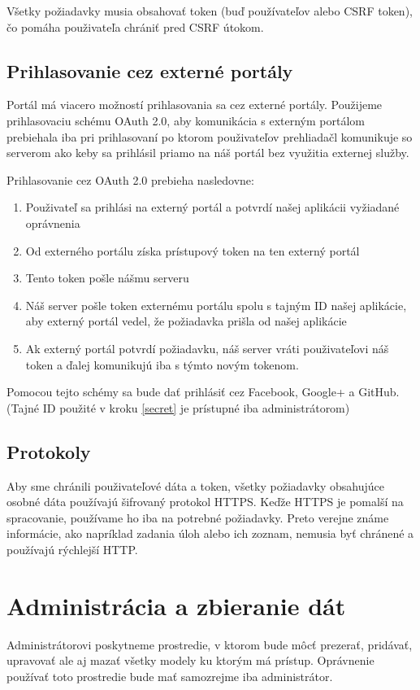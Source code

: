 Všetky požiadavky musia obsahovať token (buď používateľov alebo CSRF token),
čo pomáha použivateľa chrániť pred CSRF útokom.

\subsection{Prihlasovanie cez externé portály}
\label{oAuth}
Portál má viacero možností prihlasovania sa cez externé portály. Použijeme prihlasovaciu schému OAuth 2.0, aby komunikácia s externým
portálom prebiehala iba pri prihlasovaní po ktorom použivateľov prehliadačl komunikuje so serverom ako keby sa prihlásil priamo na náš portál bez využitia externej služby.

Prihlasovanie cez OAuth 2.0 prebieha nasledovne:
\begin{enumerate}
\item{Použivateľ sa prihlási na externý portál a potvrdí našej aplikácii vyžiadané oprávnenia}
\item{Od externého portálu získa prístupový token na ten externý portál}
\item \label{secret}{Tento token pošle nášmu serveru}
\item{Náš server pošle token externému portálu spolu s tajným ID našej aplikácie, aby externý portál vedel, že požiadavka prišla od našej aplikácie}
\item{Ak externý portál potvrdí požiadavku, náš server vráti použivateľovi náš token a ďalej komunikujú iba s týmto novým tokenom.}
\end{enumerate}

Pomocou tejto schémy sa bude dať prihlásiť cez Facebook, Google+ a GitHub.
\newline
(Tajné ID použité v kroku \ref{secret} je prístupné iba administrátorom)

\subsection{Protokoly}
Aby sme chránili použivateľové dáta a token, všetky požiadavky obsahujúce osobné dáta používajú šifrovaný protokol HTTPS. Keďže HTTPS je pomalší na spracovanie,
používame ho iba na potrebné požiadavky. Preto verejne známe informácie, ako napríklad zadania úloh alebo ich zoznam, nemusia byť chránené a používajú rýchlejší HTTP.
\section{Administrácia a zbieranie dát}
Administrátorovi poskytneme prostredie, v ktorom bude môcť prezerať, pridávať,
upravovať ale aj mazať všetky modely ku ktorým má prístup. Oprávnenie
používať toto prostredie bude mať samozrejme iba administrátor.
